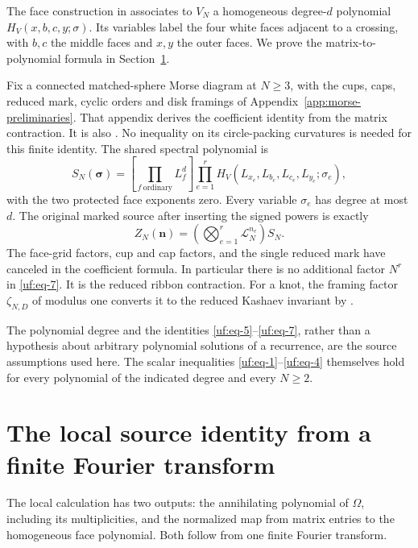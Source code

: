 The face construction in \cite[Section 4]{Finite} associates to
$V_N$ a homogeneous degree-$d$ polynomial
$H_V(x,b,c,y;\sigma)$. Its variables label the four white faces
adjacent to a crossing, with $b,c$ the middle faces and $x,y$ the
outer faces. We prove the matrix-to-polynomial formula in
Section~\ref{uf:local-fourier}.

Fix a connected matched-sphere Morse diagram at $N\ge3$, with the
cups, caps, reduced mark, cyclic orders and disk framings of
Appendix~\ref{app:morse-preliminaries}. That appendix derives the
coefficient identity from the matrix contraction. It is also
\cite[Theorem 9.1 and Corollary 9.2]{Finite}. No inequality on its
circle-packing curvatures is needed for this finite identity.
The shared spectral
polynomial is \begin{equation}\label{uf:eq-6}
S_N(\boldsymbol\sigma)=
 [\textstyle\prod_{f\ \mathrm{ordinary}}L_f^d]
       \prod_{e=1}^{r}H_V(L_{x_e},L_{b_e},L_{c_e},L_{y_e};\sigma_e),
\end{equation} with the two protected face exponents zero. Every variable
\(\sigma_e\) has degree at most \(d\). The original marked source after
inserting the signed powers is exactly \begin{equation}\label{uf:eq-7}
Z_N(\boldsymbol n)=
        \left(\bigotimes_{e=1}^r\mathcal L_N^{n_e}\right)S_N.
\end{equation} The face-grid factors, cup and cap factors, and the single reduced
mark have canceled in the coefficient formula. In particular there is
no additional factor $N^r$ in \eqref{uf:eq-7}. It is the reduced ribbon
contraction. For a knot, the framing factor $\zeta_{N,D}$ of modulus
one converts it to the reduced Kashaev invariant by
\cite[Theorem 10.1]{Finite}.

The polynomial degree and the identities \eqref{uf:eq-5}--\eqref{uf:eq-7}, rather than a
hypothesis about arbitrary polynomial solutions of a recurrence, are the
source assumptions used here. The scalar inequalities \eqref{uf:eq-1}--\eqref{uf:eq-4}
themselves hold for every polynomial of the indicated degree and every
\(N\ge2\).

\section{The local source identity from a finite Fourier transform}
\label{uf:local-fourier}

The local calculation has two outputs: the annihilating polynomial
of \(\Omega\), including its multiplicities, and the normalized map
from matrix entries to the homogeneous face polynomial. Both follow
from one finite Fourier transform.

